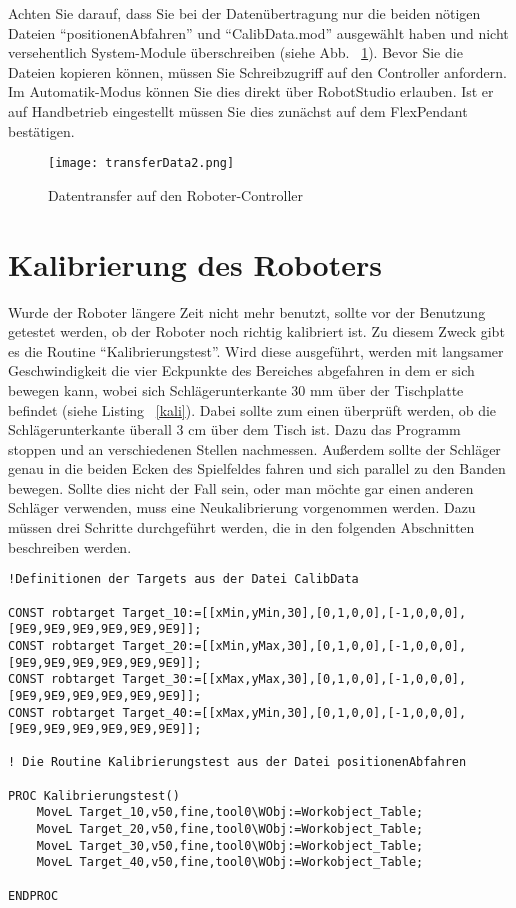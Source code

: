 Achten Sie darauf, dass Sie bei der Datenübertragung nur die beiden nötigen Dateien \enquote{positionenAbfahren} und \enquote{CalibData.mod} ausgewählt haben und nicht versehentlich System-Module überschreiben (siehe Abb. ~\ref{transfer}). Bevor Sie die Dateien kopieren können, müssen Sie Schreibzugriff auf den Controller anfordern. Im Automatik-Modus können Sie dies direkt über RobotStudio erlauben. Ist er auf Handbetrieb eingestellt müssen Sie dies zunächst auf dem FlexPendant bestätigen.

\begin{figure}[htbp]
\centering
\texttt{[image: transferData2.png]}
\caption{Datentransfer auf den Roboter-Controller} 
\label{transfer}
\end{figure}
   

\section{Kalibrierung des Roboters}
Wurde der Roboter längere Zeit nicht mehr benutzt, sollte vor der Benutzung getestet werden, ob der Roboter noch richtig kalibriert ist. Zu diesem Zweck gibt es die Routine \enquote{Kalibrierungstest}. Wird diese ausgeführt, werden mit langsamer Geschwindigkeit die vier Eckpunkte des Bereiches abgefahren in dem er sich bewegen kann, wobei sich Schlägerunterkante 30 mm über der Tischplatte befindet (siehe Listing ~\ref{kali}). Dabei sollte zum einen überprüft werden, ob die Schlägerunterkante überall 3 cm über dem Tisch ist. Dazu das Programm stoppen und an verschiedenen Stellen nachmessen. Außerdem sollte der Schläger genau in die beiden Ecken des Spielfeldes fahren und sich parallel zu den Banden bewegen. Sollte dies nicht der Fall sein, oder man möchte gar einen anderen Schläger verwenden, muss eine Neukalibrierung vorgenommen werden. Dazu müssen drei Schritte durchgeführt werden, die in den folgenden Abschnitten beschreiben werden.

\begin{lstlisting}[caption=RAPID-Routine: Kalibrierungstest, label=kali]
!Definitionen der Targets aus der Datei CalibData

CONST robtarget Target_10:=[[xMin,yMin,30],[0,1,0,0],[-1,0,0,0],[9E9,9E9,9E9,9E9,9E9,9E9]];
CONST robtarget Target_20:=[[xMin,yMax,30],[0,1,0,0],[-1,0,0,0],[9E9,9E9,9E9,9E9,9E9,9E9]]; 
CONST robtarget Target_30:=[[xMax,yMax,30],[0,1,0,0],[-1,0,0,0],[9E9,9E9,9E9,9E9,9E9,9E9]];
CONST robtarget Target_40:=[[xMax,yMin,30],[0,1,0,0],[-1,0,0,0],[9E9,9E9,9E9,9E9,9E9,9E9]]; 

! Die Routine Kalibrierungstest aus der Datei positionenAbfahren

PROC Kalibrierungstest()
	MoveL Target_10,v50,fine,tool0\WObj:=Workobject_Table;
   	MoveL Target_20,v50,fine,tool0\WObj:=Workobject_Table;
    MoveL Target_30,v50,fine,tool0\WObj:=Workobject_Table; 
    MoveL Target_40,v50,fine,tool0\WObj:=Workobject_Table; 
        
ENDPROC
\end{lstlisting}

